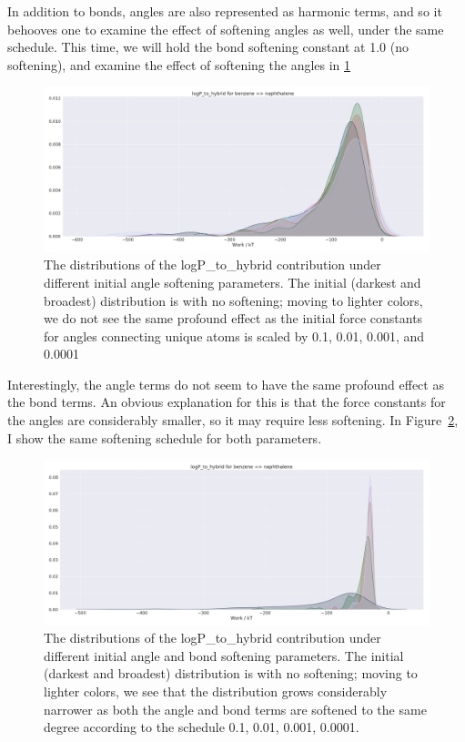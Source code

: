 %
In addition to bonds, angles are also represented as harmonic terms, and so it behooves one to examine the effect of softening angles as well, under the same schedule. This time, we will hold the bond softening constant at 1.0 (no softening), and examine the effect of softening the angles in \ref{fig:anglesoftening}
%
\begin{figure}
    \centering
    \includegraphics[width=\textwidth]{logP_tohybrid_changeangle.png}
    \caption{The distributions of the logP\_to\_hybrid contribution under different initial angle softening parameters. The initial (darkest and broadest) distribution is with no softening; moving to lighter colors, we do not see the same profound effect as the initial force constants for angles connecting unique atoms is scaled by 0.1, 0.01, 0.001, and 0.0001}
    \label{fig:anglesoftening}
\end{figure}
%
Interestingly, the angle terms do not seem to have the same profound effect as the bond terms.
%
An obvious explanation for this is that the force constants for the angles are considerably smaller, so it may require less softening.
%
In Figure~\ref{fig:softenboth}, I show the same softening schedule for both parameters.
%
\begin{figure}
    \centering
    \includegraphics[width=\textwidth]{logP_tohybrid_changeboth.png}
    \caption{The distributions of the logP\_to\_hybrid contribution under different initial angle and bond softening parameters. The initial (darkest and broadest) distribution is with no softening; moving to lighter colors, we see that the distribution grows considerably narrower as both the angle and bond terms are softened to the same degree according to the schedule 0.1, 0.01, 0.001, 0.0001.}
    \label{fig:softenboth}
\end{figure}
